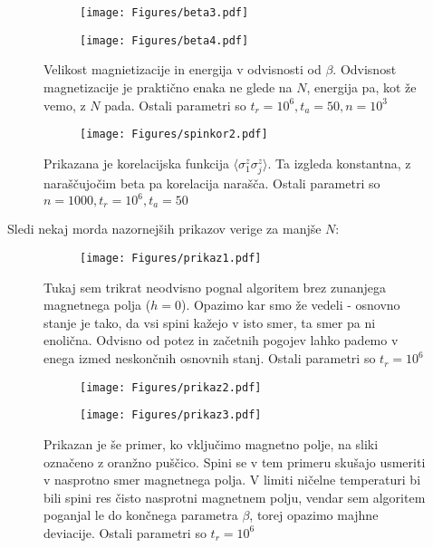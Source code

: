 \documentclass{article}
\begin{document}
\begin{figure}[H]
\centering
\begin{subfigure}{.49\textwidth}
\texttt{[image: Figures/beta3.pdf]}
\end{subfigure}
\begin{subfigure}{.49\textwidth}
\texttt{[image: Figures/beta4.pdf]}
\end{subfigure}
\caption*{Velikost magnietizacije in energija v odvisnosti od $\beta$. Odvisnost magnetizacije je praktično enaka ne glede na $N$,  energija pa, kot že vemo, z $N$ pada. Ostali parametri so $t_r = 10^6, t_a = 50, n=10^3$}
\end{figure}

\begin{figure}[H]
\centering
\begin{subfigure}{.8\textwidth}
\texttt{[image: Figures/spinkor2.pdf]}
\end{subfigure}
\caption*{Prikazana je korelacijska funkcija $\langle \sigma_1^z \sigma_j^z \rangle$. Ta izgleda konstantna, z naraščujočim beta pa korelacija narašča. Ostali parametri so $n=1000, t_r=10^6, t_a=50$}
\end{figure}

Sledi nekaj morda nazornejših prikazov verige za manjše $N$:

\begin{figure}[H]
\centering
\begin{subfigure}{.8\textwidth}
\texttt{[image: Figures/prikaz1.pdf]}
\end{subfigure}
\caption*{Tukaj sem trikrat neodvisno pognal algoritem brez zunanjega magnetnega polja ($h=0$). Opazimo kar smo že vedeli - osnovno stanje je tako, da vsi spini kažejo v isto smer, ta smer pa ni enolična. Odvisno od potez in začetnih pogojev lahko pademo v enega izmed neskončnih osnovnih stanj. Ostali parametri so $t_r = 10^6$}
\end{figure}

\begin{figure}[H]
\centering
\begin{subfigure}{.49\textwidth}
\texttt{[image: Figures/prikaz2.pdf]}
\end{subfigure}
\begin{subfigure}{.49\textwidth}
\texttt{[image: Figures/prikaz3.pdf]}
\end{subfigure}
\caption*{Prikazan je še primer, ko vključimo magnetno polje, na sliki označeno z oranžno puščico. Spini se v tem primeru skušajo usmeriti v nasprotno smer magnetnega polja. V limiti ničelne temperaturi bi bili spini res čisto nasprotni magnetnem polju, vendar sem algoritem poganjal le do končnega parametra $\beta$, torej opazimo majhne deviacije. Ostali parametri so $t_r = 10^6$}
\end{figure}
\end{document}

